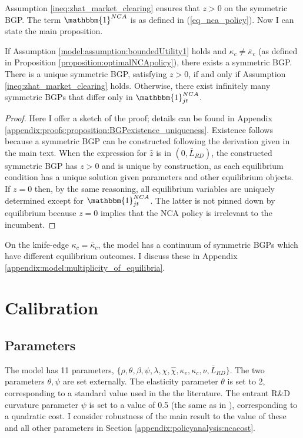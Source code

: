 \documentclass[ecta,nameyear,final]{econsocart}
\theoremstyle{plain}
\theoremstyle{remark}
\begin{document}
Assumption \ref{ineq:zhat_market_clearing} ensures that $z > 0$ on the symmetric BGP. The term $\mathbbm{1}^{NCA}$ is as defined in (\ref{eq_nca_policy}). Now I can state the main proposition.

\begin{proposition}\label{proposition:BGPexistence_uniqueness}
	If Assumption \ref{model:assumption:boundedUtility1} holds and $\kappa_c \ne \bar{\kappa}_c$ (as defined in Proposition \ref{proposition:optimalNCApolicy}), there exists a symmetric BGP. There is a unique symmetric BGP, satisfying $z > 0$, if and only if Assumption \ref{ineq:zhat_market_clearing} holds. Otherwise, there exist infinitely many symmetric BGPs that differ only in $\mathbbm{1}^{NCA}_{jt}$.
\end{proposition}

\begin{proof}
	Here I offer a sketch of the proof; details can be found in Appendix \ref{appendix:proofs:proposition:BGPexistence_uniqueness}. Existence follows because a symmetric BGP can be constructed following the derivation given in the main text. When the expression for $\hat{z}$ is in $(0,\bar{L}_{RD})$, the constructed symmetric BGP has $z > 0$ and is unique by construction, as each equilibrium condition has a unique solution given parameters and other equilibrium objects. If $z = 0$ then, by the same reasoning, all equilibrium variables are uniquely determined except for $\mathbbm{1}^{NCA}_{jt}$. The latter is not pinned down by equilibrium because $z = 0$ implies that the NCA policy is irrelevant to the incumbent.
\end{proof}

On the knife-edge $\kappa_c = \bar{\kappa}_c$, the model has a continuum of symmetric BGPs which have different equilibrium outcomes. I discuss these in Appendix \ref{appendix:model:multiplicity_of_equilibria}.

\section{Calibration}\label{sec:calibration}

\subsection{Parameters}

The model has 11 parameters, $\{\rho, \theta, \beta, \psi, \lambda, \chi, \hat{\chi}, \kappa_e, \kappa_c, \nu, \bar{L}_{RD}\}$. The two parameters $\theta, \psi$ are set externally. The elasticity parameter $\theta$ is set to 2, corresponding to a standard value used in the the literature. The entrant R\&D curvature parameter $\psi$ is set to a value of 0.5 (the same as in \cite{acemoglu_innovation_2015}), corresponding to a quadratic cost. I consider robustness of the main result to the value of these and all other parameters in Section \ref{appendix:policyanalysis:ncacost}.
\end{document}
